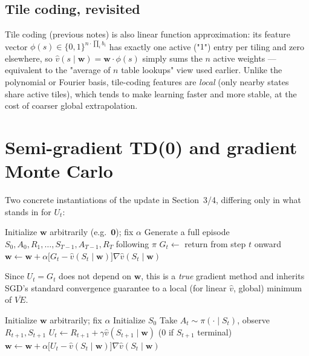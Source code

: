 \documentclass[11pt]{article}
\begin{document}
\subsection{Tile coding, revisited}

Tile coding (previous notes) is also linear function approximation: its
feature vector $\phi(s) \in \{0,1\}^{n \cdot \prod_i b_i}$ has exactly one
active ("$1$") entry per tiling and zero elsewhere, so
$\hat v(s\mid\mathbf{w}) = \mathbf{w}\cdot\phi(s)$ simply sums the $n$
active weights — equivalent to the "average of $n$ table lookups" view
used earlier. Unlike the polynomial or Fourier basis, tile-coding features
are \emph{local} (only nearby states share active tiles), which tends to
make learning faster and more stable, at the cost of coarser global
extrapolation.

\section{Semi-gradient TD(0) and gradient Monte Carlo}

Two concrete instantiations of the update in Section~3/4, differing only
in what stands in for $U_t$:

\begin{algorithm}[h]
\caption{Gradient Monte Carlo for $\hat v \approx v_\pi$}
\begin{algorithmic}[1]
\State Initialize $\mathbf{w}$ arbitrarily (e.g.\ $\mathbf{0}$); fix $\alpha$
    \State Generate a full episode $S_0, A_0, R_1, \dots, S_{T-1}, A_{T-1}, R_T$ following $\pi$
        \State $G_t \leftarrow$ return from step $t$ onward
        \State $\mathbf{w} \leftarrow \mathbf{w} + \alpha \big[ G_t - \hat v(S_t \mid \mathbf{w}) \big] \nabla \hat v(S_t \mid \mathbf{w})$
    \EndFor
\EndFor
\end{algorithmic}
\end{algorithm}

Since $U_t = G_t$ does not depend on $\mathbf{w}$, this is a \emph{true}
gradient method and inherits SGD's standard convergence guarantee to a
local (for linear $\hat v$, global) minimum of $\overline{VE}$.

\begin{algorithm}[h]
\caption{Semi-gradient TD(0) for $\hat v \approx v_\pi$}
\begin{algorithmic}[1]
\State Initialize $\mathbf{w}$ arbitrarily; fix $\alpha$
    \State Initialize $S_0$
        \State Take $A_t \sim \pi(\cdot \mid S_t)$, observe $R_{t+1}, S_{t+1}$
        \State $U_t \leftarrow R_{t+1} + \gamma \hat v(S_{t+1} \mid \mathbf{w})$ \quad (0 if $S_{t+1}$ terminal)
        \State $\mathbf{w} \leftarrow \mathbf{w} + \alpha \big[ U_t - \hat v(S_t \mid \mathbf{w}) \big] \nabla \hat v(S_t \mid \mathbf{w})$
    \EndFor
\EndFor
\end{algorithmic}
\end{algorithm}
\end{document}
